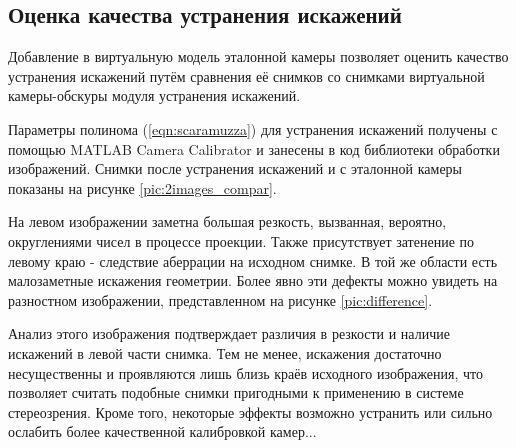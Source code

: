 
\subsection{Оценка качества устранения искажений}

Добавление в виртуальную модель эталонной камеры позволяет оценить качество устранения искажений путём сравнения
её снимков со снимками виртуальной камеры-обскуры модуля устранения искажений. %

Параметры полинома (\ref{eqn:scaramuzza}) для устранения искажений получены с помощью MATLAB Camera Calibrator и занесены 
в код библиотеки обработки изображений. %
Снимки после устранения искажений и с эталонной камеры показаны на рисунке \ref{pic:2images_compar}.


На левом изображении заметна большая резкость, вызванная, вероятно, округлениями чисел в процессе проекции. Также присутствует 
затенение по левому краю - следствие аберрации на исходном снимке. В той же области есть малозаметные искажения геометрии. Более 
явно эти дефекты можно увидеть на разностном изображении, представленном на рисунке \ref{pic:difference}. 


Анализ этого изображения подтверждает различия в резкости и наличие искажений в левой части снимка. Тем не менее, искажения
достаточно несущественны и проявляются лишь близь краёв исходного изображения, что позволяет считать подобные снимки пригодными 
к применению в системе стереозрения.  Кроме того, некоторые эффекты возможно устранить или  сильно ослабить более качественной 
калибровкой камер... %
